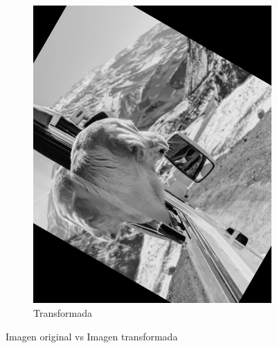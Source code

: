 \documentclass[a4paper, 12pt]{article}
\begin{document}
\begin{figure}[!ht]
\begin{subfigure}[b]{0.3\textwidth}
        \includegraphics[width=\textwidth]{img/dog-transformed.png}
        \caption{Transformada}
        \label{fig:imagen-transformada}
    \end{subfigure}
    \caption{Imagen original vs Imagen transformada}
    \label{fig:imagenes}
\end{figure}



\nocite{*}
\end{document}
